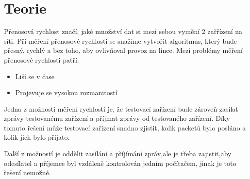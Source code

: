 \documentclass[11pt] {article}
\begin{document}
\section{Teorie}
Přenosová rychlost značí, jaké množství dat si mezi sebou vymění 2 zařřízení na síti. \cite{itslovnik}\newline
Při měření přenosové rychlosti se snažíme vytvořit algoritmus, který bude přesný, rychlý a bez toho, aby ovlivňoval provoz na lince.
Mezi problémy měření přenosové rychlosti patří:\vspace{-5px}
\begin{itemize}
\item Liší se v čase\vspace{-5px}
\item Projevuje se vysokou rozmanitostí \cite{end-to-end}
\end{itemize}
Jedna z možností měření rychlosti je, že testovací zařízení bude zároveň zasílat zprávy testovanému zařízení a příjmat zprávy od testovaného zařízení. Díky tomuto řešení může testovací zařízení snadno zjistit, kolik packetů bylo posláno a kolik jich bylo přijato.\newline
\begin{center}
\hspace{100px}\newline
\end{center} 
Další z možností je oddělit zasílání a příjímání zpráv,ale je třeba zajistit,aby odesílatel a příjemce byl vzdáleně kontrolován jedním počítačem, jinak je toto řešení nemožné. \cite{rfc}
\begin{center}
\hspace{75px}\newline
\end{center}
\newpage
\end{document}
